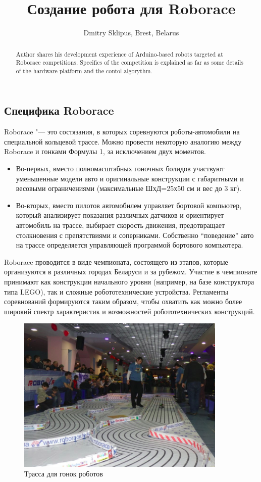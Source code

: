 \documentclass[10pt, a5paper]{article}
\begin{document}
\title{Создание робота для Roborace}
\author{Dmitry Sklipus, Brest, Belarus}
\maketitle
\begin{abstract}
Author shares his development experience of Arduino-based robots targeted at Roborace competitions. Specifics of the competition is explained as far as some details of the hardware platform and the contol algorythm.
\end{abstract}
\subsection*{Специфика Roborace}

Roborace "--- это состязания, в которых соревнуются \linebreak роботы-автомобили на специальной кольцевой трассе. Можно провести некоторую аналогию между Roborace и гонками Формулы 1, за исключением двух моментов.

\begin{itemize}
  \item Во-первых, вместо полномасштабных гоночных болидов участвуют уменьшенные модели авто и оригинальные конструкции с габаритными и весовыми ограничениями (максимальные ШхД=25х50 см и вес до 3 кг).
  \item Во-вторых, вместо пилотов автомобилем управляет бортовой компьютер, который анализирует показания различных датчиков и ориентирует автомобиль на трассе, выбирает скорость движения, предотвращает столкновения с препятствиями и соперниками. Собственно “поведение” авто на трассе определяется управляющей программой бортового компьютера.
\end{itemize}

Roborace проводится в виде чемпионата, состоящего из этапов, которые организуются в различных городах Беларуси и за рубежом. Участие в чемпионате принимают как конструкции начального уровня (например, на базе конструктора типа LEGO), так и сложные робототехнические устройства. Регламенты соревнований формируются таким образом, чтобы охватить как можно более широкий спектр характеристик и возможностей робототехнических конструкций.


\begin{figure}[h!]
  \centering
  \includegraphics[width=10cm]{w_09_2016_Sklipus1.png}
  \caption {Трасса для гонок роботов}\label{Sklipus1}
\end{figure}
\end{document}
